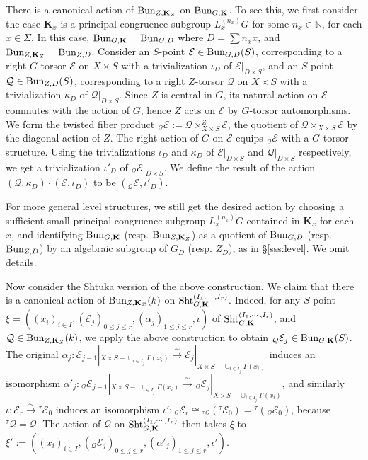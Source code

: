 \documentclass[11pt]{amsart}
\numberwithin{equation}{section}
\theoremstyle{plain}
\theoremstyle{definition}
\def\NN{\mathbb{N}}
\newcommand\cE{\mathcal{E}}
\newcommand\cQ{\mathcal{Q}}
\def\bK{\mathbf{K}}
\newcommand{\Bun}{\textup{Bun}}
\newcommand\Sht{\textup{Sht}}
\newcommand{\isom}{\stackrel{\sim}{\to}}
\renewcommand\a\alpha
\newcommand\G\Gamma
\newcommand{\io}{\iota}
\newcommand{\ka}{\kappa}
\newcommand{\Sig}{\Sigma}
\renewcommand{\t}{\tau}
\begin{document}
There is a canonical action of $\Bun_{Z,\bK_{Z}}$ on $\Bun_{G,\bK}$. To see this, we first consider the case $\bK_{x}$ is a principal congruence subgroup $L^{(n_{x})}_{x}G$ for some $n_{x}\in\NN$, for each $x\in \Sig$. In this case, 
$\Bun_{G,\bK}=\Bun_{G,D}$ where $D=\sum n_{x}x$, and $\Bun_{Z,\bK_{Z}}=\Bun_{Z,D}$. Consider an $S$-point $\cE\in\Bun_{G,D}(S)$, corresponding to a right $G$-torsor $\cE$ on $X\times S$ with a trivialization $\io_{D}$ of $\cE|_{D\times S}$, and an  $S$-point $\cQ\in \Bun_{Z,D}(S)$, corresponding to a right $Z$-torsor $\cQ$ on $X\times S$ with a trivialization $\ka_{D}$ of $\cQ|_{D\times S}$. Since $Z$ is central in $G$, its natural action on $\cE$ commutes with the action of $G$, hence $Z$ acts on $\cE$ by $G$-torsor automorphisms. We form the twisted fiber product ${}_{\cQ}\cE:=\cQ\times^{Z}_{X\times S}\cE$, the quotient of $\cQ\times_{X\times S}\cE$ by the diagonal action of $Z$. The right action of $G$ on $\cE$ equips ${}_{\cQ}\cE$ with a $G$-torsor structure. Using the trivializations $\io_{D}$ and $\ka_{D}$ of $\cE|_{D\times S}$ and $\cQ|_{D\times S}$ respectively, we get a trivialization $\io'_{D}$ of ${}_{\cQ}\cE|_{D\times S}$. We define the result of the action $(\cQ,\ka_{D})\cdot (\cE,\io_{D})$ to be $({}_{\cQ}\cE, \io'_{D})$.

For more general level structures, we still get the desired action by choosing a sufficient small principal congruence subgroup $L^{(n_{x})}_{x}G$ contained in $\bK_{x}$ for each $x$, and identifying $\Bun_{G,\bK}$ (resp. $\Bun_{Z,\bK_{Z}}$) as a quotient of $\Bun_{G,D}$ (resp. $\Bun_{Z,D}$) by an algebraic subgroup of $G_{D}$ (resp. $Z_{D}$), as in \S\ref{sss:level}. We omit details. 


Now consider the Shtuka version of the above construction.   We claim that there is a canonical action of $\Bun_{Z,\bK_{Z}}(k)$ on $\Sht^{(I_{1},\cdots, I_{r})}_{G,\bK}$. Indeed, for any $S$-point $\xi=((x_{i})_{i\in I}, (\cE_{j})_{0\le j\le r}, (\a_{j})_{1\le j\le r}, \io)$ of $\Sht^{(I_{1},\cdots, I_{r})}_{G,\bK}$, and $\cQ\in \Bun_{Z,\bK_{Z}}(k)$, we apply the above construction to obtain ${}_{\cQ}\cE_{j}\in \Bun_{G,\bK}(S)$. The original $\a_{j}: \cE_{j-1}|_{X\times S-\cup_{i\in I_{j}}\G(x_{i})}\isom  \cE_{j}|_{X\times S-\cup_{i\in I_{j}}\G(x_{i})}$ induces an isomorphism $\a'_{j}: {}_{\cQ}\cE_{j-1}|_{X\times S-\cup_{i\in I_{j}}\G(x_{i})}\isom  {}_{\cQ}\cE_{j}|_{X\times S-\cup_{i\in I_{j}}\G(x_{i})}$, and similarly $\io:\cE_{r}\isom{}^{\t}\cE_{0}$ induces an isomorphism $\io': {}_{\cQ}\cE_{r}\cong {}_{{}^{\t}\cQ}({}^{\t}\cE_{0})={}^{\t}({}_{\cQ}\cE_{0})$, because ${}^{\t}\cQ=\cQ$. The action of $\cQ$ on $\Sht^{(I_{1},\cdots, I_{r})}_{G,\bK}$ then takes $\xi$ to $\xi':=((x_{i})_{i\in I}, ({}_{\cQ}\cE_{j})_{0\le j\le r}, (\a'_{j})_{1\le j\le r}, \io')$.
\end{document}

